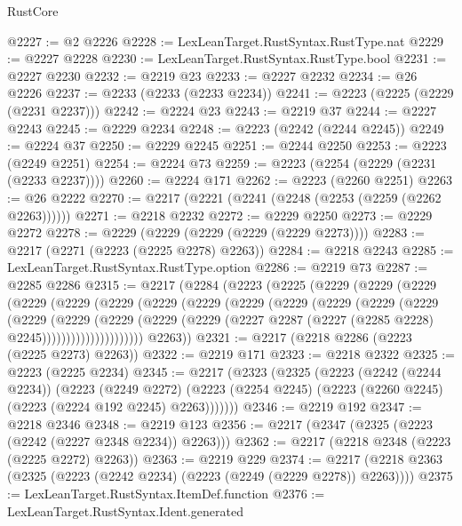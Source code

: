 \begin{lexlean}{RustCore}
\begin{coremodule}
@2227 := @2 @2226
@2228 := LexLeanTarget.RustSyntax.RustType.nat
@2229 := @2227 @2228
@2230 := LexLeanTarget.RustSyntax.RustType.bool
@2231 := @2227 @2230
@2232 := @2219 @23
@2233 := @2227 @2232
@2234 := @26 @2226
@2237 := @2233 (@2233 (@2233 @2234))
@2241 := @2223 (@2225 (@2229 (@2231 @2237)))
@2242 := @2224 @23
@2243 := @2219 @37
@2244 := @2227 @2243
@2245 := @2229 @2234
@2248 := @2223 (@2242 (@2244 @2245))
@2249 := @2224 @37
@2250 := @2229 @2245
@2251 := @2244 @2250
@2253 := @2223 (@2249 @2251)
@2254 := @2224 @73
@2259 := @2223 (@2254 (@2229 (@2231 (@2233 @2237))))
@2260 := @2224 @171
@2262 := @2223 (@2260 @2251)
@2263 := @26 @2222
@2270 := @2217 (@2221 (@2241 (@2248 (@2253 (@2259 (@2262 @2263))))))
@2271 := @2218 @2232
@2272 := @2229 @2250
@2273 := @2229 @2272
@2278 := @2229 (@2229 (@2229 (@2229 (@2229 @2273))))
@2283 := @2217 (@2271 (@2223 (@2225 @2278) @2263))
@2284 := @2218 @2243
@2285 := LexLeanTarget.RustSyntax.RustType.option
@2286 := @2219 @73
@2287 := @2285 @2286
@2315 := @2217
    (@2284
      (@2223
        (@2225
          (@2229
            (@2229
              (@2229
                (@2229
                  (@2229
                    (@2229
                      (@2229
                        (@2229
                          (@2229
                            (@2229
                              (@2229
                                (@2229
                                  (@2229
                                    (@2229
                                      (@2229
                                        (@2229
                                          (@2229
                                            (@2229
                                              (@2227
                                                @2287
                                                (@2227 (@2285 @2228) @2245)))))))))))))))))))))
        @2263))
@2321 := @2217 (@2218 @2286 (@2223 (@2225 @2273) @2263))
@2322 := @2219 @171
@2323 := @2218 @2322
@2325 := @2223 (@2225 @2234)
@2345 := @2217
    (@2323
      (@2325
        (@2223
          (@2242 (@2244 @2234))
          (@2223
            (@2249 @2272)
            (@2223 (@2254 @2245) (@2223 (@2260 @2245) (@2223 (@2224 @192 @2245) @2263)))))))
@2346 := @2219 @192
@2347 := @2218 @2346
@2348 := @2219 @123
@2356 := @2217 (@2347 (@2325 (@2223 (@2242 (@2227 @2348 @2234)) @2263)))
@2362 := @2217 (@2218 @2348 (@2223 (@2225 @2272) @2263))
@2363 := @2219 @229
@2374 := @2217 (@2218 @2363 (@2325 (@2223 (@2242 @2234) (@2223 (@2249 (@2229 @2278)) @2263))))
@2375 := LexLeanTarget.RustSyntax.ItemDef.function
@2376 := LexLeanTarget.RustSyntax.Ident.generated

\end{coremodule}
\end{lexlean}
